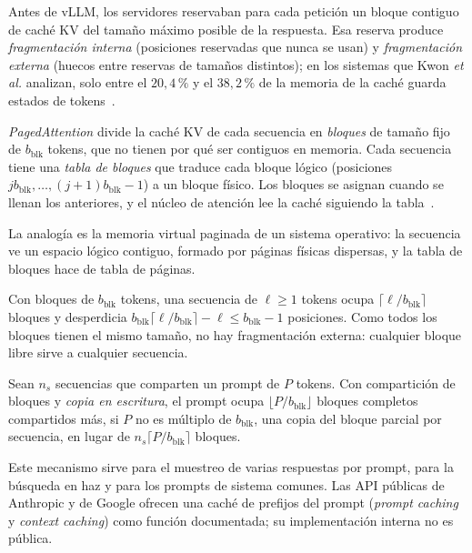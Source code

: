 Antes de vLLM, los servidores reservaban para cada petición un bloque contiguo de caché KV del tamaño máximo posible de la respuesta. Esa reserva produce \emph{fragmentación interna} (posiciones reservadas que nunca se usan) y \emph{fragmentación externa} (huecos entre reservas de tamaños distintos); en los sistemas que Kwon \emph{et al.} analizan, solo entre el $20{,}4\,\%$ y el $38{,}2\,\%$ de la memoria de la caché guarda estados de tokens~\cite[§1 y §3.1]{kwon}.

\begin{definicion}[PagedAttention]\label{def:paged}
\emph{PagedAttention} divide la caché KV de cada secuencia en \emph{bloques} de tamaño fijo de $b_{\mathrm{blk}}$ tokens, que no tienen por qué ser contiguos en memoria. Cada secuencia tiene una \emph{tabla de bloques} que traduce cada bloque lógico (posiciones $jb_{\mathrm{blk}},\dots,(j+1)b_{\mathrm{blk}}-1$) a un bloque físico. Los bloques se asignan cuando se llenan los anteriores, y el núcleo de atención lee la caché siguiendo la tabla~\cite[§4.1 y §4.2]{kwon}.
\end{definicion}

La analogía es la memoria virtual paginada de un sistema operativo: la secuencia ve un espacio lógico contiguo, formado por páginas físicas dispersas, y la tabla de bloques hace de tabla de páginas.

\addtocounter{figure}{1}%

\begin{proposicion}\label{prop:desperdicio}
Con bloques de $b_{\mathrm{blk}}$ tokens, una secuencia de $\ell\ge 1$ tokens ocupa $\lceil\ell/b_{\mathrm{blk}}\rceil$ bloques y desperdicia $b_{\mathrm{blk}}\lceil\ell/b_{\mathrm{blk}}\rceil-\ell\le b_{\mathrm{blk}}-1$ posiciones. Como todos los bloques tienen el mismo tamaño, no hay fragmentación externa: cualquier bloque libre sirve a cualquier secuencia.
\end{proposicion}

\addtocounter{definicion}{1}%

\begin{proposicion}\label{prop:prefijo}
Sean $n_s$ secuencias que comparten un prompt de $P$ tokens. Con compartición de bloques y \emph{copia en escritura}, el prompt ocupa $\lfloor P/b_{\mathrm{blk}}\rfloor$ bloques completos compartidos más, si $P$ no es múltiplo de $b_{\mathrm{blk}}$, una copia del bloque parcial por secuencia, en lugar de $n_s\lceil P/b_{\mathrm{blk}}\rceil$ bloques.
\end{proposicion}

Este mecanismo sirve para el muestreo de varias respuestas por prompt, para la búsqueda en haz y para los prompts de sistema comunes. Las API públicas de Anthropic y de Google ofrecen una caché de prefijos del prompt (\emph{prompt caching} y \emph{context caching}) como función documentada; su implementación interna no es pública.

